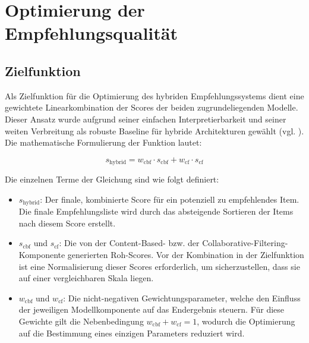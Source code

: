 \section{Optimierung der Empfehlungsqualität}
\label{chap:opt}


\subsection{Zielfunktion}
\label{sec:target_function}
Als Zielfunktion für die Optimierung des hybriden Empfehlungssystems dient eine gewichtete 
Linearkombination der Scores der beiden zugrundeliegenden Modelle. Dieser Ansatz wurde 
aufgrund seiner einfachen Interpretierbarkeit und seiner weiten Verbreitung als robuste 
Baseline für hybride Architekturen gewählt (vgl. \cite{burke_hybrid_2002}). 
Die mathematische Formulierung der Funktion lautet:

\begin{equation}
\label{eq:target}
s_\mathrm{hybrid} = w_\mathrm{cbf} \cdot s_\mathrm{cbf} + w_\mathrm{cf} \cdot s_\mathrm{cf}
\end{equation}

Die einzelnen Terme der Gleichung sind wie folgt definiert:
\begin{itemize}
    \item $s_\mathrm{hybrid}$: Der finale, kombinierte Score für ein potenziell zu empfehlendes Item. 
    Die finale Empfehlungsliste wird durch das absteigende Sortieren der Items nach diesem Score erstellt.
    
    \item $s_\mathrm{cbf}$ und $s_\mathrm{cf}$: Die von der Content-Based- bzw. der Collaborative-Filtering-Komponente 
    generierten Roh-Scores. Vor der Kombination in der Zielfunktion ist eine Normalisierung dieser 
    Scores erforderlich, um sicherzustellen, dass sie auf einer vergleichbaren Skala liegen.
    
    \item $w_\mathrm{cbf}$ und $w_\mathrm{cf}$: Die nicht-negativen Gewichtungsparameter, welche den Einfluss 
    der jeweiligen Modellkomponente auf das Endergebnis steuern. Für diese Gewichte gilt die Nebenbedingung 
    $w_\mathrm{cbf} + w_\mathrm{cf} = 1$, wodurch die Optimierung auf die Bestimmung eines einzigen 
    Parameters reduziert wird.
\end{itemize}

